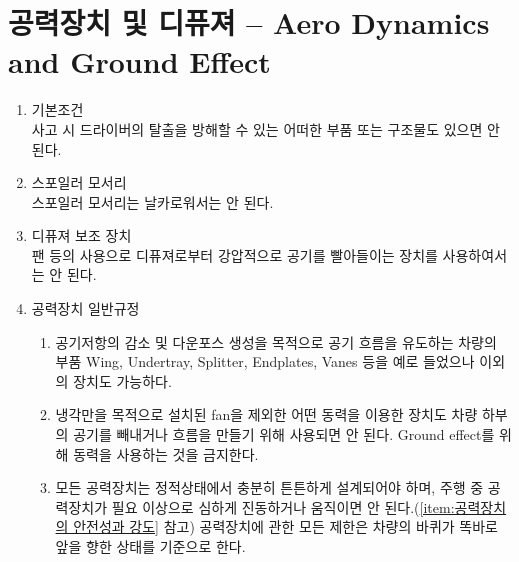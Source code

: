 \documentclass[final,a4paper,10pt]{report}
\begin{document}
\section{공력장치 및 디퓨져 – Aero Dynamics and Ground Effect}\label{rule:formula-technical.aerodynamics}
\begin{enumerate}
  \item\label{rule:formula-technical.aerodynamics.no-egress-obstruction} 기본조건\\
    사고 시 드라이버의 탈출을 방해할 수 있는 어떠한 부품 또는 구조물도 있으면 안 된다.
  \item\label{rule:formula-technical.aerodynamics.spoiler-edge-sharpness} 스포일러 모서리\\
    스포일러 모서리는 날카로워서는 안 된다.
  \item\label{rule:formula-technical.aerodynamics.no-forced-diffuser-suction} 디퓨져 보조 장치\\
    팬 등의 사용으로 디퓨져로부터 강압적으로 공기를 빨아들이는 장치를 사용하여서는 안 된다.

  \item\label{rule:formula-technical.aerodynamics.common} 공력장치 일반규정
    \begin{enumerate}
      \item\label{rule:formula-technical.aerodynamics.common.qualifying-parts} 공기저항의 감소 및 다운포스 생성을 목적으로 공기 흐름을 유도하는 차량의 부품 Wing, Undertray, Splitter, Endplates, Vanes 등을 예로 들었으나 이외의 장치도 가능하다.
      \item\label{rule:formula-technical.aerodynamics.common.powered-ground-effect-ban} 냉각만을 목적으로 설치된 fan을 제외한 어떤 동력을 이용한 장치도 차량 하부의 공기를 빼내거나 흐름을 만들기 위해 사용되면 안 된다. Ground effect를 위해 동력을 사용하는 것을 금지한다.
      \item\label{rule:formula-technical.aerodynamics.common.no-excessive-vibration} 모든 공력장치는 정적상태에서 충분히 튼튼하게 설계되어야 하며, 주행 중 공력장치가 필요 이상으로 심하게 진동하거나 움직이면 안 된다.(\ref{item:공력장치의 안전성과 강도} 참고) 공력장치에 관한 모든 제한은 차량의 바퀴가 똑바로 앞을 향한 상태를 기준으로 한다.
    \end{enumerate}



\end{enumerate}
\end{document}
